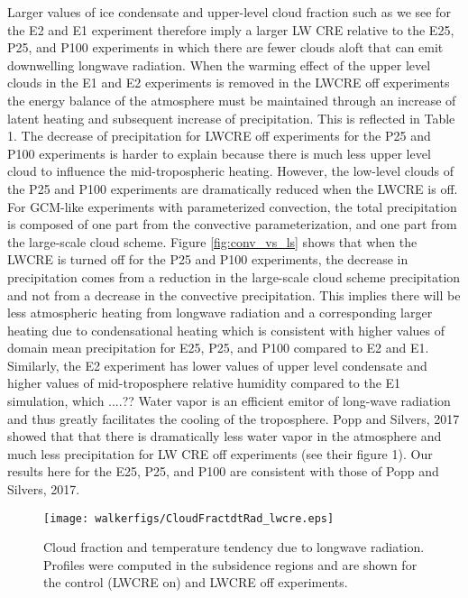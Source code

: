 \documentclass[11pt]{article}   	%
\begin{document}
Larger values of ice condensate and upper-level cloud fraction such as we see for the E2 and E1 experiment 
therefore imply a larger LW CRE relative to the E25, P25, and P100 experiments in which there are fewer clouds 
aloft that can emit downwelling longwave radiation.  When the warming effect of the upper level clouds 
in the E1 and E2 experiments is removed in the LWCRE off experiments the energy balance of the atmosphere 
must be maintained through an increase of latent heating and subsequent increase of precipitation.  This is 
reflected in Table 1.  The decrease of precipitation for LWCRE off experiments for the P25 and P100 experiments
is harder to explain because there is much less upper level cloud to influence the mid-tropospheric heating.  
However, the low-level clouds of the P25 and P100 experiments are dramatically reduced when the LWCRE is off.  For 
GCM-like experiments with parameterized convection, the total precipitation is composed of one part from the 
convective parameterization, and one part from the large-scale cloud scheme.  Figure \ref{fig:conv_vs_ls} shows 
that when the LWCRE is turned off for the P25 and P100 experiments, the decrease in precipitation comes from 
a reduction in the large-scale cloud scheme precipitation and not from a decrease in the convective precipitation.       
This implies there will be less atmospheric heating from 
longwave radiation and a corresponding larger heating due to condensational heating which is consistent with higher values 
of domain mean precipitation for E25, P25, and P100 compared to E2 and E1.  Similarly, the E2 experiment has lower values 
of upper level condensate and higher values of mid-troposphere relative humidity compared to the E1 simulation, which ....??  
Water vapor is an efficient emitor of long-wave radiation and thus greatly facilitates the cooling of the troposphere.  
Popp and Silvers, 2017 showed that that there is dramatically less water vapor in the atmosphere and much less precipitation 
for LW CRE off experiments (see their figure 1).  Our results here for the E25, P25, and P100 are consistent with 
those of Popp and Silvers, 2017.  


\begin{figure}
  \centering
      \texttt{[image: walkerfigs/CloudFractdtRad\_lwcre.eps]}
  \caption{Cloud fraction and temperature tendency due to longwave radiation.  Profiles were computed in the 
  subsidence regions and are shown for the control (LWCRE on) and LWCRE off experiments.}
  \label{fig:cf_tdtlw}
\end{figure}
\end{document}
